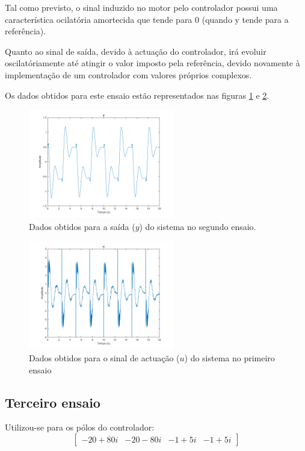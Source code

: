 \documentclass[%
  reprint,
  nofootinbib,
  amsmath,amssymb,
  aps,
  10pt,
  a4paper
]{revtex4-1}
\begin{document}
Tal como previsto, o sinal induzido no motor pelo controlador possui uma característica ocilatória amortecida que tende para 0 (quando y tende para a referência).

Quanto ao sinal de saída, devido à actuação do controlador, irá evoluir oscilatóriamente até atingir o valor imposto pela referência, devido novamente à implementação de um controlador com valores próprios complexos.

Os dados obtidos para este ensaio estão representados nas figuras \ref{fig:y_seg} e \ref{fig:u_seg}.

\begin{figure}[t]
\includegraphics[width=2.5in]{../imgs/dados_00_c/dados_00_c_y.png}
\caption{Dados obtidos para a saída ($y$) do sistema no segundo ensaio.}
\label{fig:y_seg}
\end{figure}
\begin{figure}[t]
\includegraphics[width=2.5in]{../imgs/dados_00_c/dados_00_c_u.png}
\caption{Dados obtidos para o sinal de actuação ($u$) do sistema no primeiro ensaio}
\label{fig:u_seg}
\end{figure}
\subsection{Terceiro ensaio}

Utilizou-se para os pólos do controlador:
\begin{equation}
\begin{bmatrix}
-20+80i & -20-80i  & -1+5i &-1+5i
\end{bmatrix}
\end{equation}
\end{document}
